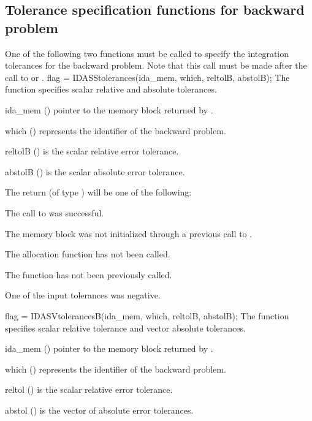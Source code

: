 \subsection{Tolerance specification functions for backward problem}
\label{sss:idatolerances_b}
One of the following two functions must be called to specify the integration 
tolerances for the backward problem. Note that this call must be made after the 
call to  or .
{
  flag = IDASStolerances(ida\_mem, which, reltolB, abstolB);
}
{
  The function  specifies scalar relative and absolute
  tolerances.
}
{
  \begin{args}
  \item[ida\_mem] ()
    pointer to the {\idas} memory block returned by .
  \item[which] ()
    represents the identifier of the backward problem.
  \item[reltolB] ()
    is the scalar relative error tolerance.
  \item[abstolB] ()
    is the scalar absolute error tolerance.
  \end{args}
}
{
  The return  (of type ) will be one of the following:
  \begin{args}
  \item[\Id{IDA\_SUCCESS}]
    The call to  was successful.
  \item[\Id{IDA\_MEM\_NULL}] 
    The {\idas} memory block was not initialized through a previous call to
    .
  \item[\Id{IDA\_NO\_MALLOC}] 
    The allocation function  has not been called.
  \item[\Id{IDA\_NO\_ADJ}]
    The function  has not been previously called.
  \item[\Id{IDA\_ILL\_INPUT}] 
    One of the input tolerances was negative.
  \end{args}
}
{}
{
  flag = IDASVtolerancesB(ida\_mem, which, reltolB, abstolB);
}
{
  The function  specifies scalar relative tolerance and
  vector absolute tolerances.
}
{
  \begin{args}
  \item[ida\_mem] ()
    pointer to the {\idas} memory block returned by .
  \item[which] ()
    represents the identifier of the backward problem.
  \item[reltol] ()
    is the scalar relative error tolerance.
  \item[abstol] ()
    is the vector of absolute error tolerances.
  \end{args}
}
